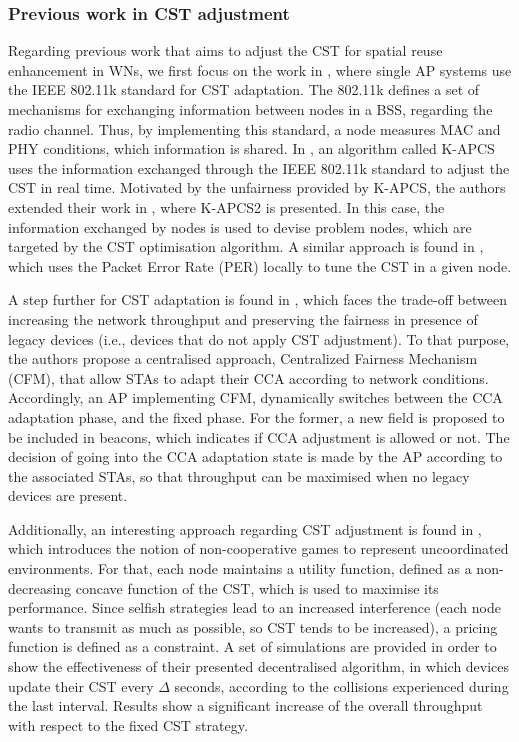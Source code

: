 \documentclass[12pt, a4paper,twoside]{tesi_upf}
\begin{document}
			\subsubsection{Previous work in CST adjustment}
			\label{section:other_cst}
				Regarding previous work that aims to adjust the CST for spatial reuse enhancement in WNs, we first focus on the work in \cite{thorpe2009ieee802, thorpe2011ieee802}, where single AP systems use the IEEE 802.11k standard \cite{ieee2002ieee} for CST adaptation. The 802.11k defines a set of mechanisms for exchanging information between nodes in a BSS, regarding the radio channel. Thus, by implementing this standard, a node measures MAC and PHY conditions, which information is shared. In \cite{thorpe2009ieee802}, an algorithm called K-APCS uses the information exchanged through the IEEE 802.11k standard to adjust the CST in real time. Motivated by the unfairness provided by K-APCS, the authors extended their work in \cite{thorpe2011ieee802}, where K-APCS2 is presented. In this case, the information exchanged by nodes is used to devise problem nodes, which are targeted by the CST optimisation algorithm. A similar approach is found in \cite{zhu2006adaptive}, which uses the Packet Error Rate (PER) locally to tune the CST in a given node. 
				
				A step further for CST adaptation is found in \cite{afifi2016throughput}, which faces the trade-off between increasing the network throughput and preserving the fairness in presence of legacy devices (i.e., devices that do not apply CST adjustment). To that purpose, the authors propose a centralised approach, Centralized Fairness Mechanism (CFM), that allow STAs to adapt their CCA according to network conditions. Accordingly, an AP implementing CFM, dynamically switches between the CCA adaptation phase, and the fixed phase. For the former, a new field is proposed to be included in beacons, which indicates if CCA adjustment is allowed or not. The decision of going into the CCA adaptation state is made by the AP according to the associated STAs, so that throughput can be maximised when no legacy devices are present.
				
				Additionally, an interesting approach regarding CST adjustment is found in \cite{park2009noncooperative}, which introduces the notion of non-cooperative games to represent uncoordinated environments. For that, each node maintains a utility function, defined as a non-decreasing concave function of the CST, which is used to maximise its performance. Since selfish strategies lead to an increased interference (each node wants to transmit as much as possible, so CST tends to be increased), a pricing function is defined as a constraint. A set of simulations are provided in order to show the effectiveness of their presented decentralised algorithm, in which devices update their CST every $\Delta$ seconds, according to the collisions experienced during the last interval. Results show a significant increase of the overall throughput with respect to the fixed CST strategy.
				
\end{document}
